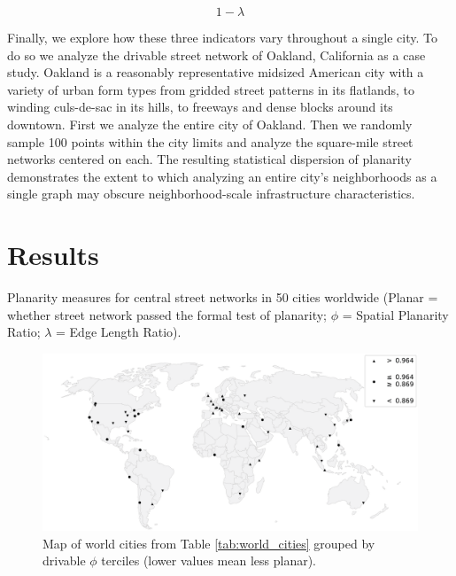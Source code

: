 \documentclass[Afour,sageh,times]{sagej}
\begin{document}
\begin{equation}
	\label{eq:elr_understates}
	1 - \lambda
\end{equation}

Finally, we explore how these three indicators vary throughout a single city. To do so we analyze the drivable street network of Oakland, California as a case study. Oakland is a reasonably representative midsized American city with a variety of urban form types from gridded street patterns in its flatlands, to winding culs-de-sac in its hills, to freeways and dense blocks around its downtown. First we analyze the entire city of Oakland. Then we randomly sample 100 points within the city limits and analyze the square-mile street networks centered on each. The resulting statistical dispersion of planarity demonstrates the extent to which analyzing an entire city's neighborhoods as a single graph may obscure neighborhood-scale infrastructure characteristics.



\section{Results}

\begin{table}[htbp]
	\centering
	\caption{Planarity measures for central street networks in 50 cities worldwide (Planar = whether street network passed the formal test of planarity; $\phi$ = Spatial Planarity Ratio; $\lambda$ = Edge Length Ratio).}
	\label{tab:world_cities}
	
\end{table}

\begin{figure}[htbp]
	\centering
	\includegraphics[width=\textwidth]{figures_tables/world_map_bw.png}
	\caption{Map of world cities from Table \ref{tab:world_cities} grouped by drivable $\phi$ terciles (lower values mean less planar).}
	\label{fig:world_map_bw}
\end{figure}
\end{document}

